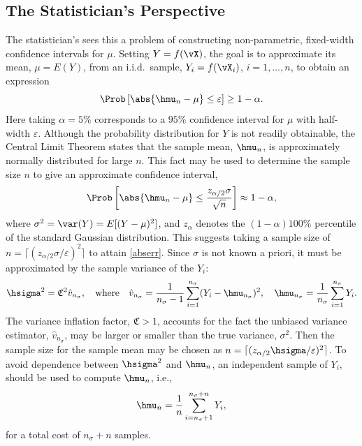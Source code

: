 \documentclass[graybox]{svmult}
\newcommand{\hv}{\hat{v}}
\newcommand{\fudge}{\mathfrak{C}}
\begin{document}
\subsection{The Statistician's Perspective} \label{statperspsec}  
The statistician's sees this a problem of constructing non-parametric, fixed-width confidence intervals for $\mu$.  Setting $Y=f(\vX)$, the goal is to approximate its mean, $\mu=E(Y)$, from an i.i.d.\ sample, $Y_i=f(\vX_i)$, $i=1, \ldots, n$, to obtain an expression
\begin{equation} \label{abserr}
\Prob\left[\abs{\hmu_n-\mu} \le \varepsilon \right] \geq 1-\alpha.
\end{equation}
Here taking $\alpha=5\%$ corresponds to a $95\%$ confidence interval for $\mu$ with half-width $\varepsilon$.  Although the probability distribution for $Y$ is not readily obtainable, the Central Limit Theorem states that the sample mean, $\hmu_n$, is approximately normally distributed for large $n$.  This fact may be used to determine the sample size $n$ to give an approximate confidence interval, 
\begin{equation} \label{CLT}
\Prob\left[\abs{\hmu_n-\mu} \le \frac{z_{\alpha/2} \sigma} {\sqrt{n}} \right] \approx 1-\alpha,
\end{equation}
where $\sigma^2 = \var(Y)=E[(Y-\mu)^2]$, and $z_\alpha$ denotes the $(1-\alpha)100\%$ percentile of the standard Gaussian distribution.  This suggests taking a sample size of $n=\lceil (z_{\alpha/2}\sigma/\varepsilon)^2\rceil$ to attain \eqref{abserr}.  Since $\sigma$ is not known a priori, it must be approximated by the sample variance of the $Y_i$:
\begin{equation} \label{samplevar}
\hsigma^2 = \fudge^2 \hv_{n_{\sigma}}, \quad \text{where} \quad \hv_{n_{\sigma}} = \frac 1{n_{\sigma}-1} \sum_{i=1}^{n_{\sigma}} (Y_i- \hmu_{n_{\sigma}})^2, \quad \hmu_{n_{\sigma}} = \frac 1{n_{\sigma}} \sum_{i=1}^{n_{\sigma}} Y_i.
\end{equation}
The variance inflation factor, $\fudge>1$, accounts for the fact the unbiased variance estimator, $\hv_{n_{\sigma}}$, may be larger or smaller than the true variance, $\sigma^2$.  Then the sample size for the sample mean may be chosen as $n=\lceil (z_{\alpha/2}\hsigma/\varepsilon)^2\rceil$.  To avoid dependence between $\hsigma^2$ and $\hmu_n$, an independent sample of $Y_i$, should be used to compute $\hmu_n$, i.e., 
\begin{equation} \label{simpleMCest}
\hmu_n = \frac 1n \sum_{i=n_{\sigma}+1}^{n_{\sigma}+n} Y_i,
\end{equation}
for a total cost of $n_{\sigma}+n$ samples.
\end{document}
